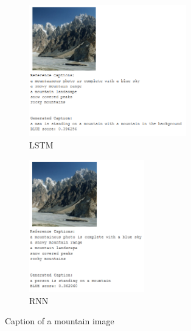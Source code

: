 \documentclass{article}
\begin{document}
    \begin{figure}[h!]
        \centering
        \begin{subfigure}[t]{0.4\textwidth}
            \centering
            \includegraphics[width=0.75\textwidth]{lstm_mountain.PNG}
            \caption{LSTM}
            \label{figc:figa}
        \end{subfigure}
        \begin{subfigure}[t]{0.4\textwidth}
            \centering
            \includegraphics[width=0.55\textwidth]{rnn_mountain.PNG}
            \caption{RNN}
            \label{figc:figb}
        \end{subfigure}
        \caption{Caption of a mountain image}
        \label{fige}
    \end{figure}
\end{document}

